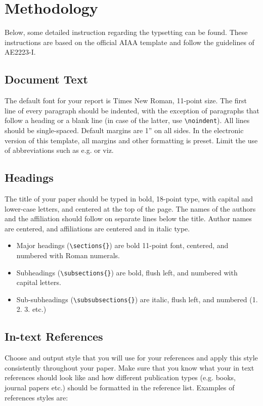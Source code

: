 \section{Methodology}

Below, some detailed instruction regarding the typsetting can be found. These instructions are based on the official AIAA template and follow the guidelines of AE2223-I.

\subsection{Document Text}
The default font for your report is Times New Roman, 11-point size. The first line of every paragraph should be indented, with the exception of paragraphs that follow a heading or a blank line (in case of the latter, use \verb+\noindent+). All lines should be single-spaced. Default margins are 1” on all sides. In the electronic version of this template, all margins and other formatting is preset. Limit the use of abbreviations such as e.g. or viz.

\subsection{Headings}
The title of your paper should be typed in bold, 18-point type, with capital and lower-case letters, and centered at the top of the page. The names of the authors and the affiliation should follow on separate lines below the title. Author names are centered, and affiliations are centered and in italic type.

\begin{itemize}
    \item Major headings (\verb+\sections{}+) are bold 11-point font, centered, and numbered with Roman numerals.
    \item Subheadings (\verb+\subsections{}+) are bold, flush left, and numbered with capital letters.
    \item Sub-subheadings (\verb+\subsubsections{}+) are italic, flush left, and numbered (1. 2. 3. etc.)
\end{itemize}

\subsection{In-text References}
Choose and output style that you will use for your references and apply this style consistently throughout your paper. Make sure that you know what your in text references should look like and how different publication types (e.g. books, journal papers etc.) should  be formatted in the reference list.  Examples of references styles are:

